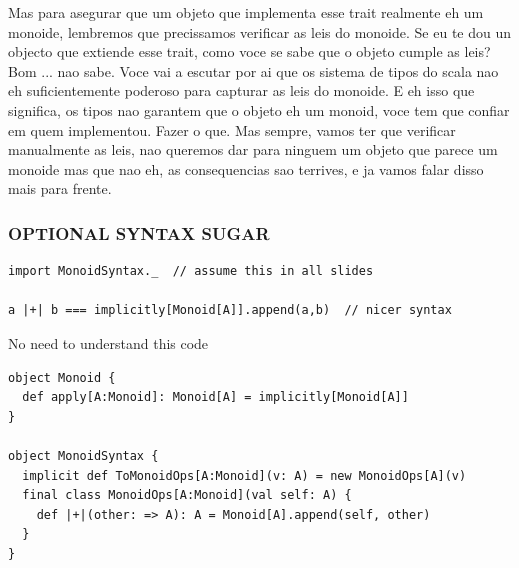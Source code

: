 \documentclass{beamer}
\begin{document}
\begin{frame}[fragile]
{    Mas para asegurar que um objeto que implementa esse trait realmente eh um
    monoide, lembremos que precissamos verificar as leis do monoide. Se eu te
    dou un objecto que extiende esse trait, como voce se sabe que o objeto
    cumple as leis? Bom ... nao sabe. Voce vai a escutar por ai que os sistema
    de tipos do scala nao eh suficientemente poderoso para capturar as leis do
    monoide. E eh isso que significa, os tipos nao garantem que o objeto eh um
    monoid, voce tem que confiar em quem implementou. Fazer o que. Mas sempre,
    vamos ter que verificar manualmente as leis, nao queremos dar para ninguem
    um objeto que parece um monoide mas que nao eh, as consequencias sao
    terrives, e ja vamos falar disso mais para frente.
  }
\end{frame}

\begin{frame}[fragile]\frametitle{OPTIONAL SYNTAX SUGAR}
  \begin{block}{}
  \begin{lstlisting}
import MonoidSyntax._  // assume this in all slides

a |+| b === implicitly[Monoid[A]].append(a,b)  // nicer syntax
  \end{lstlisting}
  \end{block}

  \begin{block}{No need to understand this code}
  \begin{lstlisting}
object Monoid {
  def apply[A:Monoid]: Monoid[A] = implicitly[Monoid[A]]
}

object MonoidSyntax {
  implicit def ToMonoidOps[A:Monoid](v: A) = new MonoidOps[A](v)
  final class MonoidOps[A:Monoid](val self: A) {
    def |+|(other: => A): A = Monoid[A].append(self, other)
  }
}
  \end{lstlisting}
  \end{block}
\end{frame}
\end{document}
